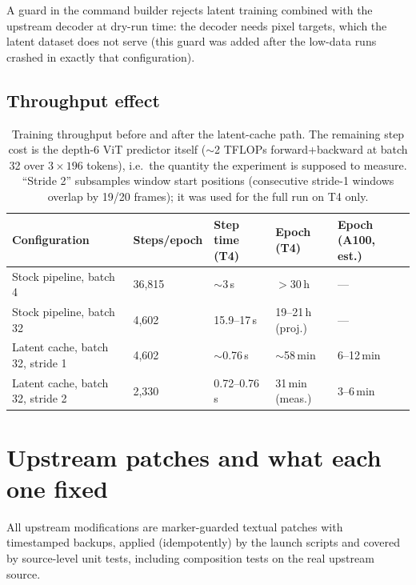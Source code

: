 \documentclass[11pt]{article}
\begin{document}
A guard in the command builder rejects latent training combined with the
upstream decoder at dry-run time: the decoder needs pixel targets, which the
latent dataset does not serve (this guard was added after the low-data runs
crashed in exactly that configuration).

\subsection{Throughput effect}

\begin{table}[h]
\centering
\small
\begin{tabular}{lllll}
\toprule
Configuration & Steps/epoch & Step time (T4) & Epoch (T4) & Epoch (A100, est.) \\
\midrule
Stock pipeline, batch 4              & 36{,}815 & $\sim$3\,s    & $>$30\,h          & --- \\
Stock pipeline, batch 32             & 4{,}602  & 15.9--17\,s   & 19--21\,h (proj.) & --- \\
Latent cache, batch 32, stride 1     & 4{,}602  & $\sim$0.76\,s & $\sim$58\,min     & 6--12\,min \\
Latent cache, batch 32, stride 2     & 2{,}330  & 0.72--0.76\,s & 31\,min (meas.)   & 3--6\,min \\
\bottomrule
\end{tabular}
\caption{Training throughput before and after the latent-cache path. The
remaining step cost is the depth-6 ViT predictor itself ($\sim$2 TFLOPs
forward+backward at batch 32 over $3\times196$ tokens), i.e.\ the quantity
the experiment is supposed to measure. ``Stride 2'' subsamples window start
positions (consecutive stride-1 windows overlap by 19/20 frames); it was used
for the full run on T4 only.}
\label{tab:throughput}
\end{table}

\section{Upstream patches and what each one fixed}
\label{sec:patches}

All upstream modifications are marker-guarded textual patches with
timestamped backups, applied (idempotently) by the launch scripts and covered
by source-level unit tests, including composition tests on the real upstream
source.
\end{document}
